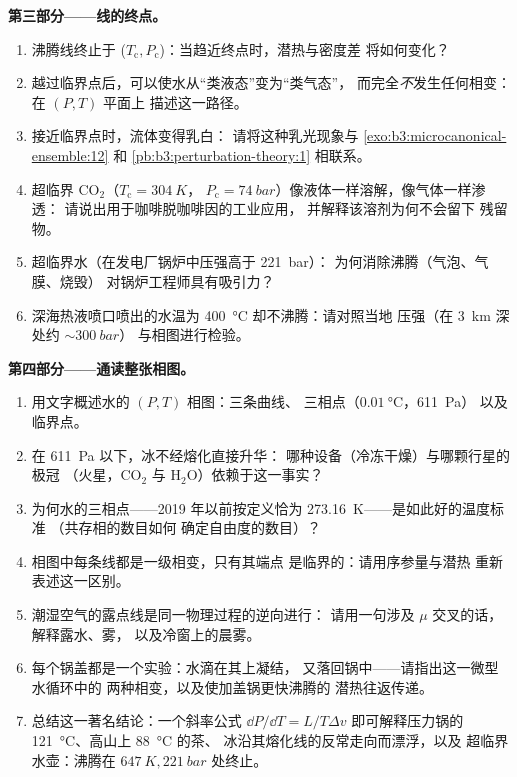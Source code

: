 \begin{problem}
\medskip\noindent\textbf{第三部分——线的终点。}
\begin{enumerate}[resume]
  \item 沸腾线终止于 ($T_{\text{c}},
        P_{\text{c}}$)：当趋近终点时，潜热与密度差
        将如何变化？
  \item 越过临界点后，可以使水从“类液态”变为“类气态”，
        而完全\emph{不}发生任何相变：在 $(P, T)$ 平面上
        描述这一路径。
  \item 接近临界点时，流体变得乳白：
        请将这种乳光现象与
        \cref{exo:b3:microcanonical-ensemble:12} 和
        \cref{pb:b3:perturbation-theory:1} 相联系。
  \item 超临界 CO$_2$（$T_{\text{c}} = \qty{304}{K}$，
        $P_{\text{c}} = \qty{74}{bar}$）像液体一样溶解，像气体一样渗透：
        请说出用于咖啡脱咖啡因的工业应用，
        并解释该溶剂为何不会留下
        残留物。
  \item 超临界水（在发电厂锅炉中压强高于 \qty{221}{bar}）：
        为何消除沸腾（气泡、气膜、烧毁）
        对锅炉工程师具有吸引力？
  \item 深海热液喷口喷出的水温为
        \qty{400}{\celsius} 却不沸腾：请对照当地
        压强（在 \qty{3}{km} 深处约 $\sim\qty{300}{bar}$）
        与相图进行检验。
\end{enumerate}

\medskip\noindent\textbf{第四部分——通读整张相图。}
\begin{enumerate}[resume]
  \item 用文字概述水的 $(P, T)$ 相图：三条曲线、
        三相点（$\qty{0.01}{\celsius}$，\qty{611}{Pa}）
        以及临界点。
  \item 在 \qty{611}{Pa} 以下，冰不经熔化直接升华：
        哪种设备（冷冻干燥）与哪颗行星的极冠
        （火星，CO$_2$ 与 H$_2$O）依赖于这一事实？
  \item 为何水的三相点——2019 年以前按定义恰为
        \qty{273.16}{K}——是如此好的温度标准
        （共存相的数目如何
        确定自由度的数目）？
  \item 相图中每条线都是一级相变，只有其端点
        是临界的：请用序参量与潜热
        重新表述这一区别。
  \item 潮湿空气的露点线是同一物理过程的逆向进行：
        请用一句涉及 $\mu$ 交叉的话，解释露水、雾，
        以及冷窗上的晨雾。
  \item 每个锅盖都是一个实验：水滴在其上凝结，
        又落回锅中——请指出这一微型水循环中的
        两种相变，以及使加盖锅更快沸腾的
        潜热往返传递。
  \item 总结这一著名结论：一个斜率公式 $\dd P/
        \dd T = L/T\Delta v$ 即可解释压力锅的
        \qty{121}{\celsius}、高山上 \qty{88}{\celsius} 的茶、
        冰沿其熔化线的反常走向而漂浮，以及
        超临界水壶：沸腾在
        $\qty{647}{K}, \qty{221}{bar}$ 处终止。
\end{enumerate}
\end{problem}
